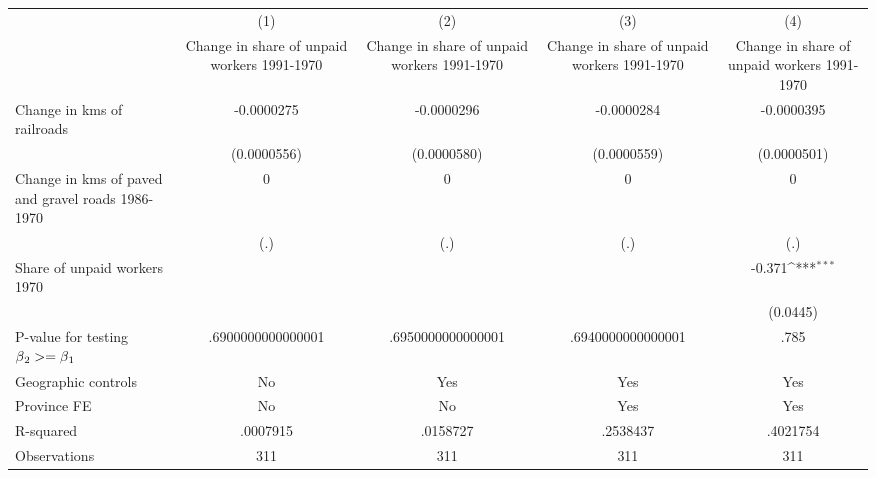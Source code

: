 {
\def\sym#1{\ifmmode^{#1}\else\(^{#1}\)\fi}
\begin{tabular}{l*{4}{c}}
\hline\hline
                &\multicolumn{1}{c}{(1)}&\multicolumn{1}{c}{(2)}&\multicolumn{1}{c}{(3)}&\multicolumn{1}{c}{(4)}\\
                &\multicolumn{1}{c}{Change in share of unpaid workers 1991-1970}&\multicolumn{1}{c}{Change in share of unpaid workers 1991-1970}&\multicolumn{1}{c}{Change in share of unpaid workers 1991-1970}&\multicolumn{1}{c}{Change in share of unpaid workers 1991-1970}\\
\hline
Change in kms of railroads&-0.0000275         &-0.0000296         &-0.0000284         &-0.0000395         \\
                &(0.0000556)         &(0.0000580)         &(0.0000559)         &(0.0000501)         \\
[1em]
Change in kms of paved and gravel roads 1986-1970&        0         &        0         &        0         &        0         \\
                &      (.)         &      (.)         &      (.)         &      (.)         \\
[1em]
Share of unpaid workers 1970&                  &                  &                  &   -0.371\sym{***}\\
                &                  &                  &                  & (0.0445)         \\
\hline
P-value for testing $\beta\\_2 >= \beta\\_1$&.6900000000000001         &.6950000000000001         &.6940000000000001         &     .785         \\
Geographic controls&       No         &      Yes         &      Yes         &      Yes         \\
Province FE     &       No         &       No         &      Yes         &      Yes         \\
R-squared       & .0007915         & .0158727         & .2538437         & .4021754         \\
Observations    &      311         &      311         &      311         &      311         \\
\hline\hline
\end{tabular}
}

